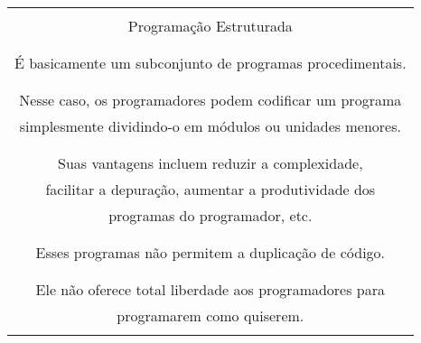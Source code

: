 \documentclass[12pt,a4paper]{abntex2}
\begin{document}
\begin{table}%
    \begin{tabular}{|c|} \hline \\
    Programação Estruturada \\\\ \hline \\
    É basicamente um subconjunto de programas procedimentais. \\ \\ \hdashline \\
    Nesse caso, os programadores podem codificar um programa\\
    simplesmente dividindo-o em módulos ou unidades menores.\\ \\ \hdashline \\
    Suas vantagens incluem reduzir a complexidade,\\
    facilitar a depuração, aumentar a produtividade dos\\
    programas do programador, etc. \\ \\ \hdashline \\
    Esses programas não permitem a duplicação de código.\\ \\ \hdashline \\
    Ele não oferece total liberdade aos programadores para\\
    programarem como quiserem. \\ \\ \hline
    \end{tabular}
\end{table}
\end{document}

